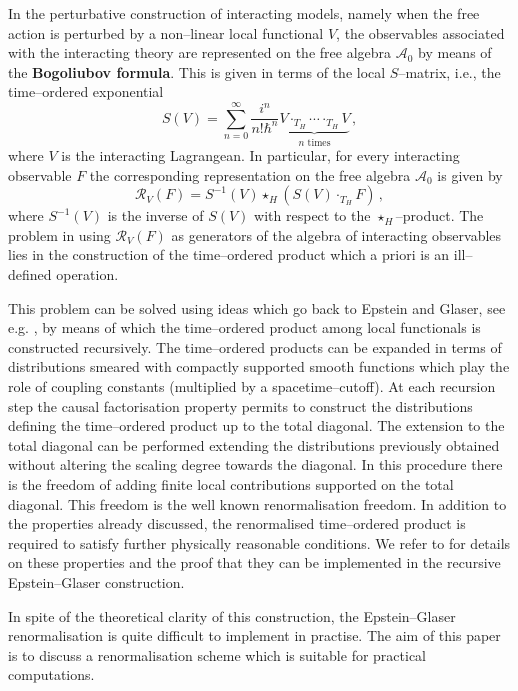 \documentclass[10pt]{book}
\newcommand{\Acal}{\mathcal{A}}
\theoremstyle{break}
\begin{document}
In the perturbative construction of interacting models, namely when the free action is perturbed by a non--linear local functional $V$, the observables associated with the interacting theory are represented on the free algebra $\Acal_0$ by means of the {\bf Bogoliubov formula}. This is given in terms of the local $S$--matrix, i.e., the time--ordered exponential
%
\begin{equation}
S(V)=\sum^\infty_{n=0}\frac{i^n}{n!\hbar^n}\underbrace{V\cdot_{T_H} \cdots \cdot_{T_H} V}_{n \text{ times}}\,,
\end{equation}
%
where $V$ is the interacting Lagrangean.  In particular, for every interacting observable $F$ the corresponding representation on the free algebra $\Acal_0$ is given by
\begin{equation}
\mathcal{R}_V(F) = S^{-1}(V)\star_H \left(  S(V)\cdot_{T_H} F \right)\,, 
\end{equation}
where $S^{-1}(V)$ is the inverse of $S(V)$ with respect to the $\star_H$--product. The problem in using $\mathcal{R}_V(F)$ as generators of the algebra of interacting observables lies in the construction of the time--ordered product which a priori is an ill--defined operation.

This problem can be solved using ideas which go back to Epstein and Glaser, see e.g. %
, by means of which the time--ordered product among local functionals is constructed recursively.
The time--ordered products can be expanded in terms of distributions smeared with compactly supported smooth functions which play the role of coupling constants (multiplied by a spacetime--cutoff). At each recursion step the causal factorisation property %
permits to construct the distributions defining the time--ordered product up to the total diagonal. 
The extension to the total diagonal can be performed extending the distributions previously obtained without altering the scaling degree towards the diagonal. In this procedure there is the freedom of adding finite local contributions supported on the total diagonal. This freedom is the well known renormalisation freedom. In addition to the properties already discussed, the renormalised time--ordered product is required to satisfy further physically reasonable conditions. We refer to %
for details on these properties and the proof that they can be implemented in the recursive Epstein--Glaser construction.

In spite of the theoretical clarity of this construction, the Epstein--Glaser renormalisation is quite difficult to implement in practise. The aim of this paper is to discuss a renormalisation scheme which is suitable for practical computations.
\end{document}

